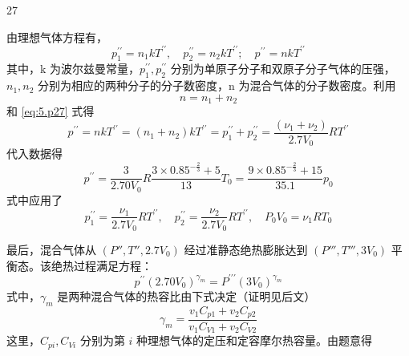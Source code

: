 \begin{solution}{27}
\begin{subsolution}
\begin{equation}
      \label{eq:4.p27}
    \end{equation}
    由理想气体方程有，
    \begin{equation}
      p_{1}^{\prime \prime} = n_{1} k T^{\prime \prime}, \quad p_{2}^{\prime \prime} = n_{2} k T^{\prime \prime}; \quad p^{\prime \prime} = n k T^{\prime \prime}
      \label{eq:5.p27}
    \end{equation}
    其中，k 为波尔兹曼常量，$p_{1}^{\prime\prime}, p_{2}^{\prime\prime}$ 分别为单原子分子和双原子分子气体的压强，$n_{1}, n_{2}$ 分别为相应的两种分子的分子数密度，n 为混合气体的分子数密度。利用
    \begin{equation}
      n = n_{1} + n_{2}
    \end{equation}
    和 \eqref{eq:5.p27} 式得
    \begin{equation}
      p^{\prime \prime} = n k T^{\prime \prime} = (n_{1} + n_{2}) k T^{\prime \prime} = p_{1}^{\prime \prime} + p_{2}^{\prime \prime} = \frac{(\nu_{1} + \nu_{2})}{2.7 V_{0}} R T^{\prime \prime}
      \label{eq:6.p27}
    \end{equation}
    代入数据得
    \begin{equation}
      p^{\prime \prime} = \frac{3}{2.70 V_{0}} R \frac{3 \times 0.85^{- \frac{2}{3}} + 5}{13} T_{0} = \frac{9 \times 0.85^{- \frac{2}{3}} + 15}{35.1} p_{0}
      \label{eq:7.p27}
    \end{equation}
    式中应用了
    \begin{equation}
      p_{1}^{\prime \prime} = \frac{\nu_{1}}{2.7 V_{0}} R T^{\prime \prime}, \quad p_{2}^{\prime \prime} = \frac{\nu_{2}}{2.7 V_{0}} R T^{\prime \prime}, \quad P_{0} V_{0} = \nu_{1} R T_{0}
    \end{equation}
  \end{subsolution}
  \begin{subsolution}
    最后，混合气体从 $(P'', T'', 2.7V_0)$ 经过准静态绝热膨胀达到 $(P''', T''', 3V_0)$ 平衡态。该绝热过程满足方程：
    \begin{equation}
      p^{\prime \prime} (2.70 V_{0})^{\gamma_{m}} = P^{\prime \prime \prime} (3 V_{0})^{\gamma_{m}}
      \label{eq:8.p27}
    \end{equation}
    式中，$\gamma_{m}$ 是两种混合气体的热容比由下式决定（证明见后文）
    \begin{equation}
      \gamma_{m} = \frac{v_{1} C_{p 1} + v_{2} C_{p 2}}{v_{1} C_{V 1} + v_{2} C_{V 2}}
      \label{eq:9.p27}
    \end{equation}
    这里，$C_{pi}, C_{Vi}$ 分别为第 $i$ 种理想气体的定压和定容摩尔热容量。由题意得

\end{subsolution}
\end{solution}
